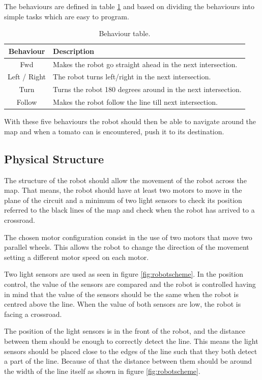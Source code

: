 \documentclass[12pt,a4paper]{article}
\begin{document}
The behaviours are defined in table \ref{tab:behaviourExplained} and based on dividing the behaviours into simple tasks which are easy to program.

\begin{table}[H]
\center
\begin{tabular}{c|l}
Behaviour & Description \\ \hline
Fwd & Makes the robot go straight ahead in the next intersection. \\
Left / Right & The robot turns left/right in the next intersection. \\
Turn & Turns the robot 180 degrees around in the next intersection. \\
Follow & Makes the robot follow the line till next intersection.
\end{tabular}
\caption{Behaviour table.}
\label{tab:behaviourExplained}
\end{table}

With these five behaviours the robot should then be able to navigate around the map and when a tomato can is encountered, push it to its destination.

\subsection{Physical Structure}
The structure of the robot should allow the movement of the robot across the map. 
That means, the robot should have at least two motors to move in the plane of the circuit and a minimum of two light sensors to check its position referred to the black lines of the map and check when the robot has arrived to a crossroad.

The chosen motor configuration consist in the use of two motors that move two parallel wheels. 
This allows the robot to change the direction of the movement setting a different motor speed on each motor.

Two light sensors are used as seen in figure \ref{fig:robotscheme}. 
In the position control, the value of the sensors are compared and the robot is controlled having in mind that the value of the sensors should be the same when the robot is centred above the line.
When the value of both sensors are low, the robot is facing a crossroad.

The position of the light sensors is in the front of the robot, and the distance between them should be enough to correctly detect the line. 
This means the light sensors should be placed close to the edges of the line such that they both detect a part of the line.
Because of that the distance between them should be around the width of the line itself as shown in figure \ref{fig:robotscheme}.
\end{document}
